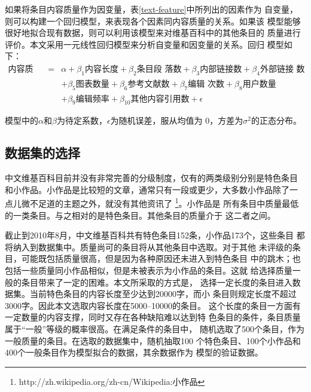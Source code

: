 如果将条目内容质量作为因变量，表\ref{text-feature}中所列出的因素作为
自变量，则可以构建一个回归模型，来表现各个因素同内容质量的关系。如果该
模型能够很好地拟合现有数据，则可以利用该模型来对维基百科中的其他条目的
质量进行评价。本文采用一元线性回归模型来分析自变量和因变量的关系。回归
模型如下：
\begin{eqnarray*}
  \label{eq:1}
  \text{内容质量}&=&\alpha+\beta_1\text{内容长度}+\beta_2 \text{条目段
    落数}+\beta_3\text{内部链接数}+\beta_4\text{外部链接
    数}\\
 &&+\beta_5\text{图表数量} +\beta_6\text{参考文献数}+\beta_7\text{编辑
   次数}+\beta_8\text{用户数量}\\
 &&+\beta_9\text{编辑频率}+\beta_{10}\text{其他内容引用数}+\epsilon
\end{eqnarray*}

模型中的$\alpha$和$\beta$为待定系数，$\epsilon$为随机误差，服从均值为
$0$，方差为$\sigma^2$的正态分布。

\subsection{数据集的选择}
\label{sec:dataset}
中文维基百科目前并没有非常完善的分级制度，仅有的两类级别分别是特色条目
和小作品。小作品是比较短的文章，通常只有一段或更少，大多数小作品除了一
点儿微不足道的主题之外，就没有其他资讯了
\footnote{http://zh.wikipedia.org/zh-cn/Wikipedia:小作品}。小作品是
所有条目中质量最低的一类条目。与之相对的是特色条目。其他条目的质量介于
这二者之间。

截止到2010年8月，中文维基百科共有特色条目152条，小作品173个，这些条目
都将纳入到数据集中。质量尚可的条目将从其他条目中选取。对于其他
未评级的条目，可能既包括质量很高，但是因为各种原因还未进入到特色条目
中的跳木；也包括一些质量同小作品相似，但是未被表示为小作品的条目。这就
给选择质量一般的条目带来了一定的困难。本文所采取的方式是，
选择一定长度的条目进入数据集。当前特色条目的内容长度至少达到20000字，而小
条目则规定长度不超过3000字。因此本文选取内容长度在5000--10000的条目。
这个长度的条目一方面有一定数量的内容支撑，同时又存在各种缺陷难以达到特
色条目的条件，条目质量属于“一般”等级的概率很高。在满足条件的条目中，
随机选取了500个条目，作为一般质量的条目。在选取的数据集中，随机抽取100
个特色条目、100个小作品和400个一般条目作为模型拟合的数据，其余数据作为
模型的验证数据。
  
